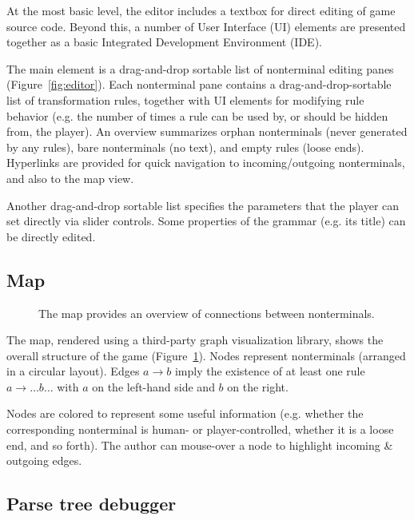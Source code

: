 \documentclass{acm_proc_article-sp}
\begin{document}
At the most basic level, the editor includes a textbox for direct editing of game source code.
Beyond this, a number of User Interface (UI)
elements are presented together as a basic Integrated Development Environment (IDE).

The main element is a drag-and-drop sortable list of nonterminal editing panes (Figure~\ref{fig:editor}).
Each nonterminal pane contains a drag-and-drop-sortable list of transformation rules,
together with UI elements for modifying rule behavior (e.g. the number of times
a rule can be used by, or should be hidden from, the player).
An overview summarizes orphan nonterminals (never generated by any rules),
bare nonterminals (no text), and empty rules (loose ends).
Hyperlinks are provided for quick navigation to incoming/outgoing nonterminals,
and also to the map view.

Another drag-and-drop sortable list specifies the parameters that the player
can set directly via slider controls.
Some properties of the grammar (e.g. its title) can be directly edited.

\subsection{Map}

\begin{figure}
\caption{
\label{fig:map}
The map provides an overview of connections between nonterminals.
}
\end{figure}

The map, rendered using a third-party graph visualization library,
shows the overall structure of the game (Figure~\ref{fig:map}).
Nodes represent nonterminals (arranged in a circular layout).
Edges $a \to b$ imply the existence of at least one rule $a \to \ldots b \ldots$
with $a$ on the left-hand side and $b$ on the right.

Nodes are colored to represent some useful information
(e.g. whether the corresponding nonterminal is human- or player-controlled,
whether it is a loose end, and so forth).
The author can mouse-over a node to highlight incoming \& outgoing edges.

\subsection{Parse tree debugger}
\end{document}
